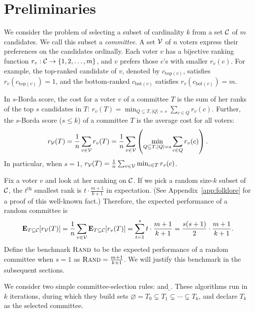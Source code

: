 \section{Preliminaries}
\label{secLprelim}

We consider the problem of selecting a subset of cardinality $k$ from a set $\mathcal{C}$ of $m$ candidates. We call this subset a \emph{committee}. A set $\mathcal{V}$ of $n$ voters express their preferences on the candidates ordinally. Each voter $v$ has a bijective ranking function $r_v : \mathcal{C} \rightarrow \{1, 2, \ldots, m\}$, and $v$ prefers those $c$'s with smaller $r_v(c)$. For example, the top-ranked candidate of $v$, denoted by $c_{\mathrm{top}(v)}$, satisfies $r_v\left(c_{\mathrm{top}(v)}\right) = 1$, and the bottom-ranked $c_{\mathrm{bot}(v)}$ satisfies $r_v\left(c_{\mathrm{bot}(v)}\right) = m$.

In $s$-Borda score, the cost for a voter $v$ of a committee $T$ is the sum of her ranks of the top $s$ candidates in $T$: $r_v(T) = \min_{Q \subseteq T, |Q| = s} \sum_{c \in Q} r_v(c)$. Further, the $s$-Borda score ($s \leq k$) of a committee $T$ is the average cost for all voters:
\[
r_{\mathcal{V}}(T) = \frac{1}{n} \sum_{v \in \mathcal{V}} r_v(T) = \frac{1}{n} \sum_{v \in \mathcal{V}} \left(\min_{Q \subseteq T, |Q| = s} \sum_{c \in Q} r_v(c)\right).
\]
In particular, when $s = 1$, $r_{\mathcal{V}}(T) = \frac{1}{n} \sum_{v \in \mathcal{V}} \min_{c \in T} r_v(c)$.

Fix a voter $v$ and look at her ranking on $\mathcal{C}$. If we pick a random size-$k$ subset of $\mathcal{C}$, the $t^{\text{th}}$ smallest rank is $t \cdot \frac{m + 1}{k + 1}$ in expectation. (See Appendix~\ref{app:folklore} for a proof of this well-known fact.)  
 Therefore, the expected performance of a random committee is
\[
\operatorname{\mathbf{E}}_{T \subseteq \mathcal{C}}[r_{\mathcal{V}}(T)] = \frac{1}{n} \sum_{v \in \mathcal{V}} \operatorname{\mathbf{E}}_{T \subseteq \mathcal{C}}[r_{v}(T)] = \sum_{t = 1}^s t \cdot \frac{m + 1}{k + 1} = \frac{s(s + 1)}{2} \cdot \frac{m + 1}{k + 1}.
\]
Define the benchmark ${\normalfont\textsc{Rand}}$ to be the expected performance of a random committee when $s = 1$ as ${\normalfont\textsc{Rand}} = \frac{m + 1}{k + 1}$. We will justify this benchmark in the subsequent sections.

We consider two simple committee-selection rules: \g{} and \b{}. These algorithms run in $k$ iterations, during which they build sets $\varnothing = T_0 \subsetneq T_1 \subsetneq \cdots \subsetneq T_k$, and declare $T_k$ as the selected committee.

